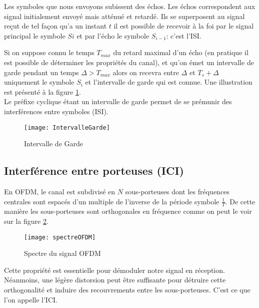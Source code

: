 Les symboles que nous envoyons subissent des échos. Les échos correspondent aux
signal initialement envoyé mais atténué et retardé. Ils se superposent au signal
reçut de tel façon qu'a un instant $t$ il est possible de recevoir à la foi par le
signal principal le symbole $Si$ et par l'écho le symbole $S_{i-1}$: c'est l'ISI.

Si on suppose connu le temps $T_{max}$ du retard maximal d'un écho (en pratique
il est possible de déterminer les propriétés du canal), et qu'on émet un
intervalle de garde pendant un temps $\Delta > T_{max}$ alors on recevra entre
$\Delta$ et $T_s+\Delta$ uniquement le symbole $S_i$ et l'intervalle de garde
qui est connue. Une illustration est présenté à la figure
\ref{fig:intervalleGarde}.
~\\

Le préfixe cyclique étant un intervalle de garde permet de se prémunir des
interférences entre symboles (ISI).



\begin{figure}[!h]
  \centering
  \texttt{[image: IntervalleGarde]}
  \caption{Intervalle de Garde}
  \label{fig:intervalleGarde}
\end{figure}

\subsection{Interférence entre porteuses (ICI)}


En OFDM, le canal est subdivisé en $N$ sous-porteuses dont les fréquences centrales
sont espacés d'un multiple de l'inverse de la période symbole $\frac{1}{T}$. De
cette manière les sous-porteuses sont orthogonales en fréquence comme on peut le
voir sur la figure \ref{fig:spectre}.

\begin{figure}[!h]
  \centering
  \texttt{[image: spectreOFDM]}
  \caption{Spectre du signal OFDM \cite{annick}}
  \label{fig:spectre}
\end{figure}

Cette propriété est essentielle pour démoduler notre signal en réception.
Néanmoins, une légère distorsion peut être suffisante pour détruire cette
orthogonalité et induire des recouvrements entre les sous-porteuses. C'est ce
que l'on appelle l'ICI.

